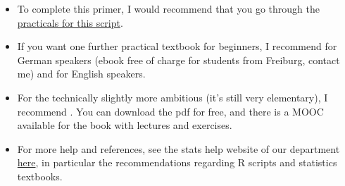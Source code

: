 \documentclass[a4paper,twoside]{tufte-book}\usepackage[]{graphicx}\usepackage[]{color}
\begin{document}
\begin{itemize}

\item To complete this primer, I would recommend that you go through the \href{https://github.com/florianhartig/ResearchSkills/tree/master/Labs/Statistics}{practicals for this script}.

\item If you want one further practical textbook for beginners, I recommend \citet{Dormann-ParametrischeStatistik-2013} for German speakers (ebook free of charge for students from Freiburg, contact me) and \citet{Gotelli-PrimerEcologicalStatistics-2004} for English speakers. 

\item For the technically slightly more ambitious (it's still very elementary), I recommend \citet{James-IntroductiontoStatistical-2013}. You can download the pdf for free, and there is a MOOC available for the book with lectures and exercises. 

\item For more help and references, see the stats help website of our department  \href{http://biometry.github.io/APES/}{here}, in particular the recommendations regarding R scripts and statistics textbooks. 

\end{itemize}






\end{document}
